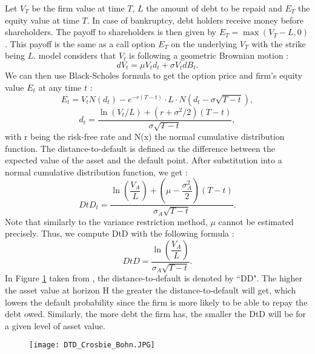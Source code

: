 Let $V_T$ be the firm value at time $T$, $L$ the amount of debt to be repaid and $E_T$ the equity value at time $T$. In case of bankruptcy, debt holders receive money before shareholders. The payoff to shareholders is then given by $E_T = \max(V_T - L,0)$. This payoff is the same as a call option $E_T$ on the underlying $V_T$ with the strike being $L$. \citet{Merton1974} model considers that $V_t$ is following a geometric Brownian motion :
\begin{equation*}
dV_t = \mu V_t d_t + \sigma V_t dB_t.
\end{equation*}
We can then use Black-Scholes formula to get the option price and firm's equity value $E_t$ at any time $t$ :
\begin{equation} \label{blackscholes}
E_t = V_t N(d_t) - e^{-r(T-t)}\cdot L \cdot N(d_t - \sigma \sqrt{T-t}),
\end{equation}
\begin{equation*}
d_t = \dfrac{\ln(V_t/L)+(r+\sigma^2/2)(T-t)}{\sigma \sqrt{T-t}},
\end{equation*}
with r being the risk-free rate and N(x) the normal cumulative distribution function.
The distance-to-default is defined as the difference between the expected value of the asset and the default point. After substitution into a normal cumulative distribution function, we get :
\begin{equation}
DtD_t = \dfrac{\ln(\dfrac{V_A}{L})+(\mu-\dfrac{\sigma_A^2}{2})(T-t)}{\sigma_A \sqrt{T-t}}.
\end{equation}
Note that similarly to the variance restriction method, $\mu$ cannot be estimated precisely. Thus, we compute DtD with the following formula :
\begin{equation}
DtD = \dfrac{\ln(\dfrac{V_A}{L})}{\sigma_A \sqrt{T-t}}.
\end{equation}
In Figure \ref{fig:DD} taken from \citet{KMV}, the distance-to-default is denoted by ``DD". The higher the asset value at horizon H the greater the distance-to-default will get, which lowers the default probability since the firm is more likely to be able to repay the debt owed. Similarly, the more debt the firm has, the smaller the DtD will be for a given level of asset value.

\begin{figure}[h!]
\centering
\texttt{[image: DTD\_Crosbie\_Bohn.JPG]} 
\label{fig:DD}
\end{figure}



